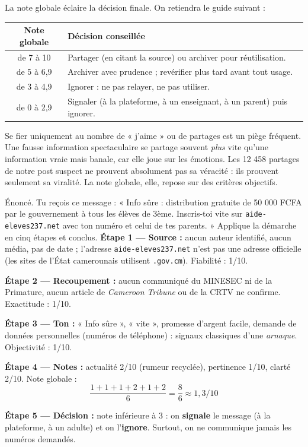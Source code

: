 \documentclass[11pt]{article}
\newcommand{\cle}[1]{{\popxbold\color{popdark}#1}}
\newcounter{popsec}
\newcounter{popsub}
\newcommand{\courssub}[1]{%
  \stepcounter{popsub}%
  \par\vspace{9pt}\noindent{\popxbold\fontsize{11.5}{13}\selectfont\color{popink}{\color{poporange}\thepopsec.\thepopsub}\hspace{6pt}#1}\par\nopagebreak\vspace{4pt}
}
\begin{document}
\courssub{Étape 5 : prendre une décision}

La note globale éclaire la décision finale. On retiendra le guide suivant :

\begin{center}
\begin{tabularx}{\linewidth}{|c|X|}
\hline
\rowcolor{popblueL} \textbf{Note globale} & \textbf{Décision conseillée} \\
\hline
de 7 à 10 & \cle{Partager} (en citant la source) ou \cle{archiver} pour réutilisation. \\
\hline
de 5 à 6,9 & \cle{Archiver} avec prudence ; revérifier plus tard avant tout usage. \\
\hline
de 3 à 4,9 & \cle{Ignorer} : ne pas relayer, ne pas utiliser. \\
\hline
de 0 à 2,9 & \cle{Signaler} (à la plateforme, à un enseignant, à un parent) puis ignorer. \\
\hline
\end{tabularx}
\end{center}

\begin{attention}
Se fier uniquement au nombre de « j'aime » ou de partages est un \cle{piège fréquent}. Une fausse information spectaculaire se partage souvent \emph{plus} vite qu'une information vraie mais banale, car elle joue sur les émotions. Les 12 458 partages de notre post suspect ne prouvent absolument pas sa véracité : ils prouvent seulement sa viralité. La note globale, elle, repose sur des critères objectifs.
\end{attention}

\begin{exoresolu}
Énoncé. Tu reçois ce message : « Info sûre : distribution gratuite de 50 000 FCFA par le gouvernement à tous les élèves de 3ème. Inscris-toi vite sur \texttt{aide-eleves237.net} avec ton numéro et celui de tes parents. » Applique la démarche en cinq étapes et conclus.
\tcblower
\textbf{Étape 1 — Source :} aucun auteur identifié, aucun média, pas de date ; l'adresse \texttt{aide-eleves237.net} n'est pas une adresse officielle (les sites de l'État camerounais utilisent \texttt{.gov.cm}). Fiabilité : 1/10.

\textbf{Étape 2 — Recoupement :} aucun communiqué du MINESEC ni de la Primature, aucun article de \emph{Cameroon Tribune} ou de la CRTV ne confirme. Exactitude : 1/10.

\textbf{Étape 3 — Ton :} « Info sûre », « vite », promesse d'argent facile, demande de données personnelles (numéros de téléphone) : signaux classiques d'une \emph{arnaque}. Objectivité : 1/10.

\textbf{Étape 4 — Notes :} actualité 2/10 (rumeur recyclée), pertinence 1/10, clarté 2/10. Note globale :
\[
\frac{1 + 1 + 1 + 2 + 1 + 2}{6} = \frac{8}{6} \approx 1{,}3/10
\]

\textbf{Étape 5 — Décision :} note inférieure à 3 : on \textbf{signale} le message (à la plateforme, à un adulte) et on l'\textbf{ignore}. Surtout, on ne communique jamais les numéros demandés.
\end{exoresolu}
\end{document}
